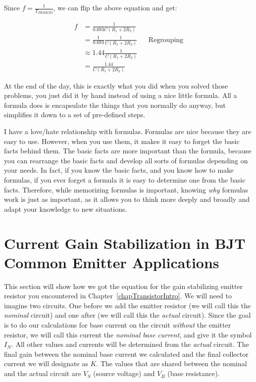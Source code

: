 Since $f = \frac{1}{T_{PERIOD}}$, we can flip the above equation and get:

\begin{align*}
f &= \frac{1}{0.693 C(R_1 + 2 R_2)} \\
  &= \frac{1}{0.693}\frac{1}{C(R_1 + 2 R_2)} && \textrm{Regrouping} \\
  &\approx 1.44 \frac{1}{C(R_1 + 2 R_2)} \\
  &= \frac{1.44}{C(R_1 + 2 R_2)}
\end{align*}

At the end of the day, this is exactly what you did when you solved those problems, you just did it by hand instead of using a nice little formula.
All a formula does is encapsulate the things that you normally do anyway, but simplifies it down to a set of pre-defined steps.

I have a love/hate relationship with formulas.  
Formulas are nice because they are easy to use.
However, when you use them, it makes it easy to forget the basic facts behind them.
The basic facts are more important than the formula, because you can rearrange the basic facts and develop all sorts of formulas depending on your needs.
In fact, if you know the basic facts, and you know how to make formulas, if you ever forget a formula it is easy to determine one from the basic facts.
Therefore, while memorizing formulas is important, knowing \emph{why} formulas work is just as important, as it allows you to think more deeply and broadly and adapt your knowledge to new situations.

\section{Current Gain Stabilization in BJT Common Emitter Applications}
\label{eqGainStabilizingEmitterResistorDCCommonEmitter}


This section will show how we got the equation for the gain stabilizing emitter resistor you encountered in Chapter~\ref{chapTransistorIntro}.
We will need to imagine two circuits.
One before we add the emitter resistor (we will call this the \emph{nominal} circuit) and one after (we will call this the \emph{actual} circuit).
Since the goal is to do our calculations for base current on the circuit \emph{without} the emitter resistor, we will call this current the \emph{nominal base current}, and give it the symbol $I_N$.
All other values and currents will be determined from the \emph{actual} circuit.
The final gain between the nominal base current we calculated and the final collector current we will designate as $K$.
The values that are shared between the nominal and the actual circuit are $V_S$ (source voltage) and $V_B$ (base resistance).

